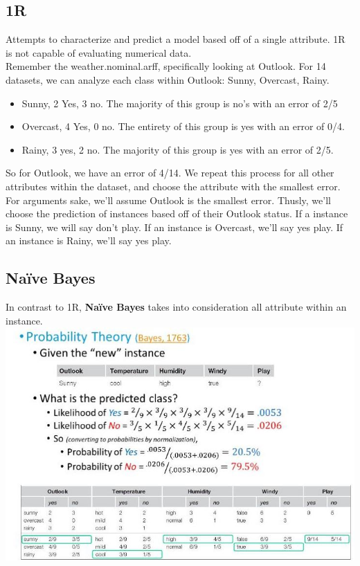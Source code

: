 \documentclass{article}
\begin{document}
\subsection{1R}
Attempts to characterize and predict a model based off of a single attribute. 1R is not capable of evaluating numerical data. \\
Remember the weather.nominal.arff, specifically looking at Outlook. For 14 datasets, we can analyze each class within Outlook: Sunny, Overcast, Rainy.
\begin{itemize}
	\item Sunny, 2 Yes, 3 no. The majority of this group is no's with an error of 2/5
	\item Overcast, 4 Yes, 0 no. The entirety of this group is yes with an error of 0/4.
	\item Rainy, 3 yes, 2 no. The majority of this group is yes with an error of 2/5.
\end{itemize}
So for Outlook, we have an error of 4/14. We repeat this process for all other attributes within the dataset, and choose the attribute with the smallest error. For arguments sake, we'll assume Outlook is the smallest error. Thusly, we'll choose the prediction of instances based off of their Outlook status. If a instance is Sunny, we will say don't play. If an instance is Overcast, we'll say yes play. If an instance is Rainy, we'll say yes play.
\subsection{Na\"ive Bayes}
In contrast to 1R, \textbf{Na\"ive Bayes} takes into consideration all attribute within an instance.\\
\includegraphics[scale=0.5]{pics/naivebayes.png}
\end{document}
